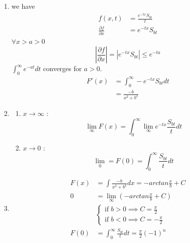 \begin{solution}
\begin{enumerate}
  \item we have $$\begin{align}
      f(x,t) & = \frac{e^{-tx}S_{bt}}{t} \\
      \frac{\partial f}{\partial x} & = e^{-tx}S_{bt}
  \end{align}$$
  $\forall x > a > 0$ $$\left|\frac{\partial f}{\partial x}\right| = |e^{-tx}S_{bt}| \le e^{-ta}$$
  $\int_0^{\infty} e^{-at} dt$ converges for $a > 0$.
  $$\begin{align}
    F'(x) & = \int_0^{\infty} - e^{-tx} S_{bt}dt \\
          & = \frac{-b}{x^2 + b^2}
  \end{align}$$
\item \begin{enumerate}
    \item  $x \to \infty$ : $$\lim_{\infty} F(x) = \int_0^{\infty}\lim_{\infty} e^{-tx} \frac{S_{bt}}{t} dt$$
    \item $x \to 0$ : $$\lim_{0}  = F(0) = \int_0^{\infty} \frac{S_{bt}}{t}dt$$ 
  \end{enumerate} 
  
\item $$\begin{align}
    F(x) & = \int \frac{-b}{x^2 + b^2}dx = - arctan \frac{x}{b} + C \\
    0 & = \lim_{\infty} (- arctan \frac{x}{b} + C) \\
     & \begin{cases}
       \text{if } b > 0 \implies C = \frac{\pi}{2}\\
       \text{if } b < 0 \implies C = -\frac{\pi}{2}
    \end{cases} \\ 
    F(0) & = \int_0^{\infty} \frac{S_{bt}}{t} dt = \frac{\pi}{2}(-1)^n
\end{align}$$ 
\end{enumerate}
\end{solution}


